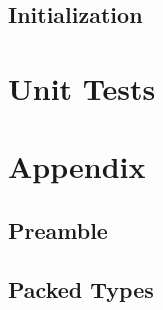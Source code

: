 \subsection{Initialization}


\section{Unit Tests}



\section{Appendix}
\subsection{Preamble}



\subsection{Packed Types}




